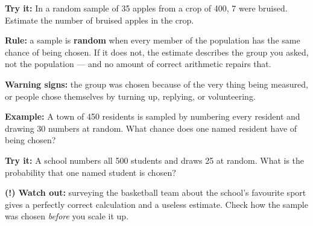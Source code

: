 \documentclass[12pt]{article}
\begin{document}
\begin{tryitbox}
\textbf{Try it:} \quad In a random sample of 35 apples from a crop of 400, 7
were bruised. Estimate the number of bruised apples in the crop.\\[2pt]
\end{tryitbox}


\begin{formulabox}
\textbf{Rule:} a sample is \textbf{random} when every member of the population
has the same chance of being chosen. If it does not, the estimate describes the
group you asked, not the population --- and no amount of correct arithmetic
repairs that.\par
\textbf{Warning signs:} the group was chosen because of the very thing being
measured, or people chose themselves by turning up, replying, or volunteering.
\end{formulabox}

\begin{examplebox}
\textbf{Example:} \quad A town of 450 residents is sampled by numbering every
resident and drawing 30 numbers at random. What chance does one named resident
have of being chosen?
\end{examplebox}

\begin{tryitbox}
\textbf{Try it:} \quad A school numbers all 500 students and draws 25 at random.
What is the probability that one named student is chosen?\\[2pt]
\end{tryitbox}

\begin{watchoutbox}
\textbf{(!) Watch out:} surveying the basketball team about the school's
favourite sport gives a perfectly correct calculation and a useless estimate.
Check how the sample was chosen \emph{before} you scale it up.
\end{watchoutbox}
\end{document}
